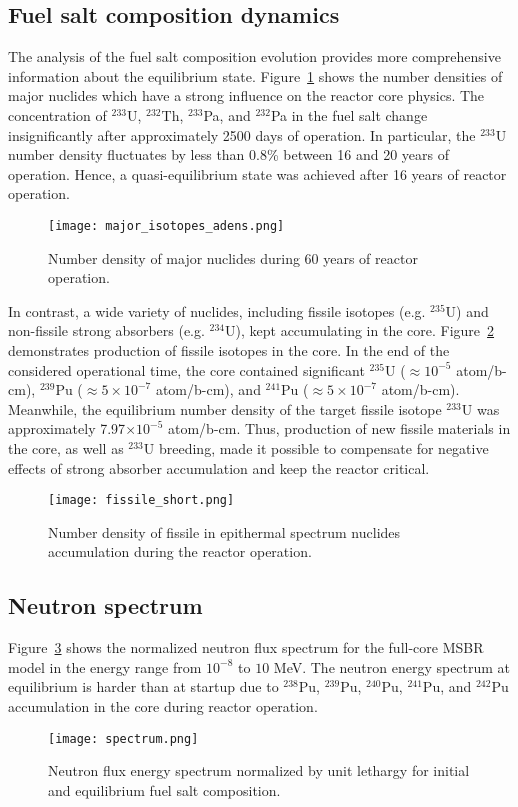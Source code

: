 \subsection{Fuel salt composition dynamics}
The analysis of the fuel salt composition evolution provides more comprehensive 
information about the equilibrium state. Figure~\ref{fig:adens_eq} shows the number 
densities of major nuclides which have a strong influence on the reactor core 
physics. The concentration of $^{233}$U, $^{232}$Th, $^{233}$Pa, and $^{232}$Pa in 
the fuel salt change insignificantly after approximately 2500 days of operation. 
In particular, the $^{233}$U number density fluctuates by less than 0.8\% between
 16 and 20 years of operation. Hence, a quasi-equilibrium state was 
achieved after 16 years of reactor operation.
\begin{figure}[ht!] %
  \centering
  \texttt{[image: major\_isotopes\_adens.png]}
  \caption{Number density of major nuclides during 60 years of reactor 
  operation.}
  \label{fig:adens_eq}
\end{figure}
In contrast, a wide variety of nuclides, including fissile isotopes (e.g. 
$^{235}$U) and non-fissile strong absorbers (e.g. $^{234}$U), kept accumulating 
in the core. Figure~\ref{fig:fissile_short} demonstrates production of fissile 
isotopes in the core. In the end of the considered operational time, the core 
contained significant $^{235}$U ($\approx10^{-5}$ atom/b-cm), $^{239}$Pu 
($\approx5\times10^{-7}$ atom/b-cm), and $^{241}$Pu ($\approx 5\times10^{-7}$ 
atom/b-cm). Meanwhile, the equilibrium number density of the target fissile 
isotope $^{233}$U was approximately 7.97$\times10^{-5}$ atom/b-cm. Thus, 
production of new fissile materials in the core, as well as $^{233}$U breeding, 
made it possible to compensate for negative effects of strong absorber 
accumulation and keep the reactor critical.
\begin{figure}[htp!] %
  \centering
  \texttt{[image: fissile\_short.png]}
  \caption{Number density of fissile in epithermal spectrum nuclides 
  accumulation during the reactor operation.}
  \label{fig:fissile_short}
\end{figure}

\subsection{Neutron spectrum}
Figure~\ref{fig:spectrum} shows the normalized neutron flux spectrum for the 
full-core \gls{MSBR} model in the energy range from $10^{-8}$ to $10$ MeV. The 
neutron energy spectrum at equilibrium is harder than at startup due to 
$^{238}$Pu, $^{239}$Pu, $^{240}$Pu, $^{241}$Pu, and $^{242}$Pu accumulation in 
the core during reactor operation.  
\begin{figure}[ht!] %
  \centering
  \texttt{[image: spectrum.png]} \caption{Neutron flux energy 
  spectrum normalized by unit lethargy for initial and equilibrium fuel salt 
  composition.}
  \label{fig:spectrum}
\end{figure}

